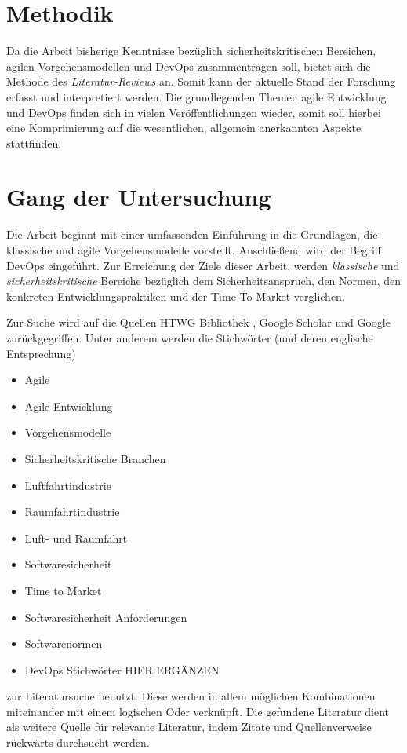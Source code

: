 \section{Methodik}

Da die Arbeit bisherige Kenntnisse bezüglich sicherheitskritischen Bereichen, agilen Vorgehensmodellen und DevOps zusammentragen soll, bietet sich die Methode des \emph{Literatur-Reviews} \parencite[vgl.][]{Fettke:2006aa} an.
Somit kann der aktuelle Stand der Forschung erfasst und interpretiert werden.
Die grundlegenden Themen agile Entwicklung und DevOps finden sich in vielen Veröffentlichungen wieder, somit soll hierbei eine Komprimierung auf die wesentlichen, allgemein anerkannten Aspekte stattfinden.

\section{Gang der Untersuchung}

Die Arbeit beginnt mit einer umfassenden Einführung in die Grundlagen,
die klassische und agile Vorgehensmodelle vorstellt.
Anschließend wird der Begriff DevOps eingeführt.
Zur Erreichung der Ziele dieser Arbeit, werden \emph{klassische} und \emph{sicherheitskritische} Bereiche bezüglich dem Sicherheitsanspruch, den Normen, den konkreten Entwicklungspraktiken und der Time To Market verglichen.

Zur Suche wird auf die Quellen HTWG Bibliothek \parencite[vgl.][]{HTWG2015aa}, Google Scholar \parencite[vgl.][]{Google2015aa} und Google \parencite[vgl.][]{Google2015ab} zurückgegriffen.
Unter anderem werden die Stichwörter (und deren englische Entsprechung)
\begin{itemize}
\item Agile
\item Agile Entwicklung
\item Vorgehensmodelle
\item Sicherheitskritische Branchen
\item Luftfahrtindustrie
\item Raumfahrtindustrie
\item Luft- und Raumfahrt
\item Softwaresicherheit
\item Time to Market
\item Softwaresicherheit Anforderungen
\item Softwarenormen
\item DevOps Stichwörter HIER ERGÄNZEN
\end{itemize}
zur Literatursuche benutzt.
Diese werden in allem möglichen Kombinationen miteinander mit einem logischen Oder verknüpft.
Die gefundene Literatur dient als weitere Quelle für relevante Literatur, indem Zitate und Quellenverweise rückwärts durchsucht werden.

